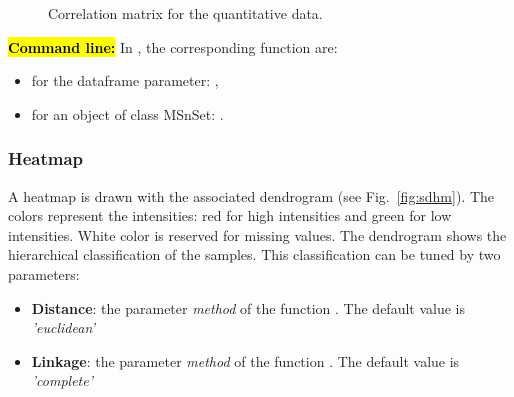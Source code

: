 \documentclass[12pt]{article}
\begin{document}
{\begin {figure}
\centering
{}
\caption{Correlation matrix for the quantitative data.}\label{fig:sdcm}
\end {figure}

\hl{\bf Command line:} In , the corresponding function are:
\begin{itemize}
\item for the dataframe parameter: ,
\item for an object of class MSnSet: .
\end{itemize}

\subsubsection {Heatmap}
A heatmap is drawn with the associated dendrogram (see Fig.~\ref{fig:sdhm}). 
The colors represent the intensities: red for high intensities and green for 
low intensities. White color is reserved for missing values.
The dendrogram shows the hierarchical classification of the samples. This 
classification can be tuned by two parameters:
\begin {itemize}
\item \textbf{Distance}: the parameter \emph{method} of the function . The default value is \emph{'euclidean'}
\item \textbf{Linkage}: the parameter \emph{method} of the function . The default value is \emph{'complete'}
\end {itemize}

}
\end{document}
